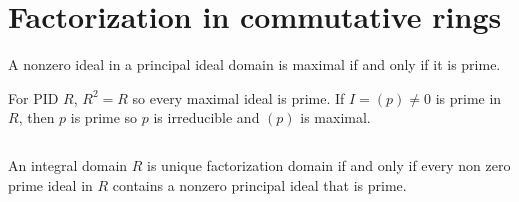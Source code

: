 \section{Factorization in commutative rings}
\begin{ex}
    A nonzero ideal in a principal ideal domain is maximal if and only if it is prime.
\end{ex}

\begin{answer}
    For PID $R$, $R^{2}=R$ so every maximal ideal is prime. If $I=(p)\neq 0$ is prime in $R$, then $p$ is prime so $p$ is irreducible and $(p)$ is maximal.
\end{answer}

$$ $$

\begin{ex}
    An integral domain $R$ is unique factorization domain if and only if every non zero prime ideal in $R$ contains a nonzero principal ideal that is prime.
\end{ex}

